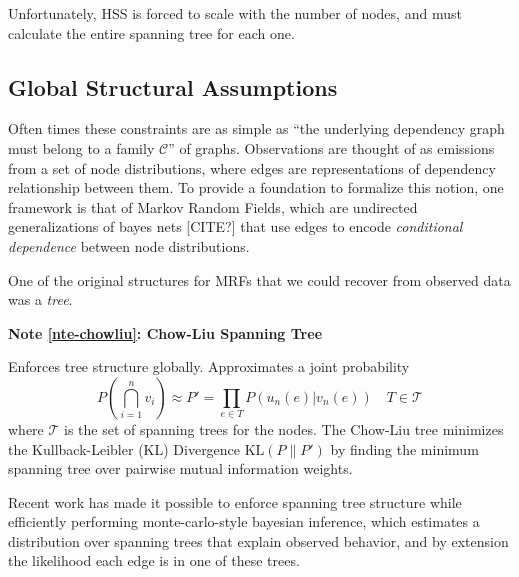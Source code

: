 \documentclass[%
	12pt,
		oneside,
		letterpaper
]{book}
\newcounter{quartocalloutnteno}
\newcommand{\quartocalloutnte}[1]{\refstepcounter{quartocalloutnteno}\label{#1}}
\begin{document}
Unfortunately, HSS is forced to scale with the number of nodes, and must
calculate the entire spanning tree for each one.

\subsection{Global Structural
Assumptions}\label{global-structural-assumptions}

Often times these constraints are as simple as ``the underlying
dependency graph must belong to a family \(\mathcal{C}\)'' of graphs.
Observations are thought of as emissions from a set of node
distributions, where edges are representations of dependency
relationship between them. To provide a foundation to formalize this
notion, one framework is that of Markov Random Fields, which are
undirected generalizations of bayes nets {[}CITE?{]} that use edges to
encode \emph{conditional dependence} between node distributions.

One of the original structures for MRFs that we could recover from
observed data was a \emph{tree}.

\begin{tcolorbox}[enhanced jigsaw, colback=white, rightrule=.15mm, opacityback=0, colframe=quarto-callout-note-color-frame, bottomrule=.15mm, arc=.35mm, breakable, leftrule=.75mm, left=2mm, toprule=.15mm]

\quartocalloutnte{nte-chowliu} 

\vspace{-3mm}\textbf{Note \ref*{nte-chowliu}: Chow-Liu Spanning Tree}\vspace{3mm}

Enforces tree structure globally. Approximates a joint probability \[
P\left(\bigcap_{i=1}^n v_i\right) \approx P' = \prod_{e\in T} P(u_n(e)|v_n(e)) \quad T\in \mathcal{T}
\] where \(\mathcal{T}\) is the set of spanning trees for the nodes. The
Chow-Liu tree minimizes the Kullback-Leibler (KL) Divergence
\(\text{KL}(P \| P')\) by finding the minimum spanning tree over
pairwise mutual information
weights.\autocite{Approximatingdiscreteprobability_Chow1968}

\end{tcolorbox}

Recent work has made it possible to enforce spanning tree structure
while efficiently performing monte-carlo-style bayesian inference, which
estimates a distribution over spanning trees that explain observed
behavior, and by extension the likelihood each edge is in one of these
trees. \autocite{BayesianSpanningTree_Duan2021}
\end{document}
